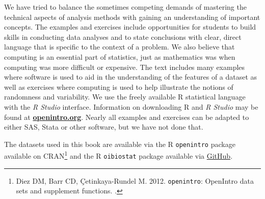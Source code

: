 We have tried to balance the sometimes competing demands of mastering the technical aspects of analysis methods with gaining an understanding of important concepts.  The examples and exercises include opportunities for students to build skills in conducting data analyses and to state conclusions with clear, direct language that is specific to the context of a problem.  We also believe that computing is an essential part of statistics, just as mathematics was when computing was more difficult or expensive.  The text includes many examples where software is used to aid in the understanding of the features of a dataset as well as exercises where computing is used to help illustrate the notions of randomness and variability. We use the freely available \textsf{R} statistical language with the \textsl{R Studio} interface.  Information on downloading \textsf{R} and \textsl{R Studio} may be found at \href{http://www.openintro.org}{\color{black}\textbf{openintro.org}}.  Nearly all examples and exercises can be adapted to either SAS, Stata or other software, but we have not done that.

The datasets used in this book are available via the \textsf{R} \texttt{openintro} package available on CRAN\footnote{Diez DM, Barr CD, \c{C}etinkaya-Rundel M. 2012. \texttt{openintro}: OpenIntro data sets and supplement functions. .}  and the \textsf{R} \texttt{oibiostat} package available via \href{<https://github.com/OI-Biostat/oi_biostat_data>}{GitHub}.




\begin{comment}

This book may be downloaded as a free PDF at \href{http://www.openintro.org}{\color{black}\textbf{openintro.org}}. %
\vspace{3mm}

\noindent We hope readers will take away three ideas from this book in addition to forming a foundation of statistical thinking and methods.\vspace{-1mm}
\begin{enumerate}
\setlength{\itemsep}{0mm}
\item[(1)] Statistics is an applied field with a wide range of practical applications.
\item[(2)] You don't have to be a math guru to learn from real, interesting data.
\item[(3)] Data is messy, and statistical tools are imperfect. But, when you understand the strengths and weaknesses of these tools, you can use them to learn about the real~world.
\end{enumerate}

\end{comment}

